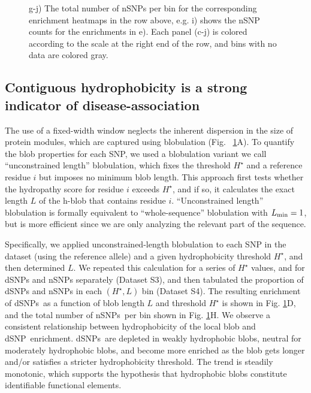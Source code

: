 \documentclass[9pt,twocolumn,twoside,lineno]{pnas-new}
\newcommand{\aucomment}[1]{}
\newcommand{\dSNPs}{dSNPs~}
\newcommand{\nSNPs}{nSNPs~}
\newcommand{\dSNP}{dSNP~}
\newcommand{\Ht}{H^{\star}}
\newcommand{\Lmin}{L_{\rm min}}
\begin{document}
\begin{figure}
{g-j) The total number of nSNPs per bin for the corresponding enrichment heatmaps in the row above, e.g. i) shows the nSNP counts for the enrichments in e). 
Each panel (c-j) is colored according to the scale at the right end of the row, and bins with no data are colored gray. \aucomment{Panels e,f,i, and j are new. Annotations were added to the other panels.}}
\label{blob_vs_window} 
\end{figure}

\subsection*{Contiguous hydrophobicity is a strong indicator of disease-association}

The use of a fixed-width window neglects the inherent dispersion in the size of protein modules, which are captured using blobulation (Fig. ~\ref{blob_vs_window}A). To quantify the blob properties for each SNP, we used a blobulation variant we call ``unconstrained length'' blobulation, which fixes the threshold $\Ht$ and a reference residue $i$ but imposes no minimum blob length. This approach first tests whether the hydropathy score for residue $i$ exceeds $\Ht$, and if so, it calculates the exact length $L$ of the h-blob that contains residue $i$. ``Unconstrained length'' blobulation is formally equivalent to ``whole-sequence'' blobulation with $\Lmin=1$, but is more efficient since we are only analyzing the relevant part of the sequence. 

Specifically, we applied unconstrained-length blobulation to each SNP in the dataset (using the reference allele) and a given hydrophobicity threshold $\Ht$, and then determined $L$.  We repeated this calculation for a series of $\Ht$ values, and for dSNPs and nSNPs separately (Dataset S3), and then tabulated the proportion of dSNPs and nSNPs in each $(\Ht,L)$ bin (Dataset S4). The resulting enrichment of \dSNPs as a function of blob length $L$ and threshold $\Ht$ is shown in Fig. \ref{blob_vs_window}D, and the total number of \nSNPs per bin shown in Fig. \ref{blob_vs_window}H.
We observe a consistent relationship between hydrophobicity of the local blob and \dSNP enrichment.  \dSNPs are depleted in weakly hydrophobic blobs, neutral for moderately hydrophobic blobs, and become more enriched as the blob gets longer and/or satisfies a stricter hydrophobicity threshold. The trend is steadily monotonic, which supports the hypothesis that hydrophobic blobs constitute identifiable functional elements.
\end{document}
